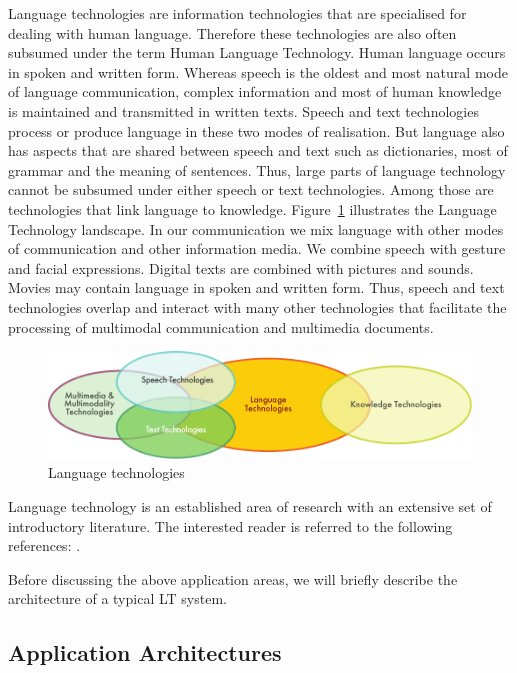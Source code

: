 \begin{multicols}{2}
\begin{itemize}
\begin{multicols}{2}
Language technologies are information technologies that are specialised for dealing with human language. Therefore these technologies are also often subsumed under the term Human Language Technology. Human language occurs in spoken and written form. Whereas speech is the oldest and most natural mode of language communication, complex information and most of human knowledge is maintained and transmitted in written texts. Speech and text technologies process or produce language in these two modes of realisation. But language also has aspects that are shared between speech and text such as dictionaries, most of grammar and the meaning of sentences. Thus, large parts of language technology cannot be subsumed under either speech or text technologies. Among those are technologies that link language to knowledge. Figure~\ref{fig:ltincontext_en}  illustrates the Language Technology landscape. In our communication we mix language with other modes of communication and other information media. We combine speech with gesture and facial expressions. Digital texts are combined with pictures and sounds. Movies may contain language in spoken and written form. Thus, speech and text technologies overlap and interact with many other technologies that facilitate the processing of multimodal communication and multimedia documents.  

\begin{figure}[htb]
  \center
  \includegraphics[width=\textwidth]{../_media/english/language_technologies}
  \caption{Language technologies}
  \label{fig:ltincontext_en}
\end{figure}

Language technology is an established area of research with an extensive set of introductory literature. The interested reader is referred to the following references:  \cite{jurafsky-martin01, manning-schuetze1, lt-world1, lt-survey1}.

Before discussing the above application areas, we will briefly describe the architecture of a typical LT system.

\subsection{Application Architectures}


\end{multicols}
\end{itemize}
\end{multicols}
